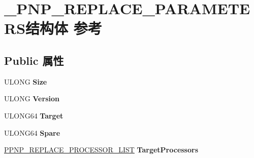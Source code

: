 \hypertarget{struct___p_n_p___r_e_p_l_a_c_e___p_a_r_a_m_e_t_e_r_s}{}\section{\+\_\+\+P\+N\+P\+\_\+\+R\+E\+P\+L\+A\+C\+E\+\_\+\+P\+A\+R\+A\+M\+E\+T\+E\+R\+S结构体 参考}
\label{struct___p_n_p___r_e_p_l_a_c_e___p_a_r_a_m_e_t_e_r_s}
\subsection*{Public 属性}
\begin{DoxyCompactItemize}
\item 
\mbox{\label{struct___p_n_p___r_e_p_l_a_c_e___p_a_r_a_m_e_t_e_r_s_a4cfdef7f7338ef93936209b069cecb13}} 
U\+L\+O\+NG {\bfseries Size}
\item 
\mbox{\label{struct___p_n_p___r_e_p_l_a_c_e___p_a_r_a_m_e_t_e_r_s_a1e1000807f3221c711d791f685b30fd9}} 
U\+L\+O\+NG {\bfseries Version}
\item 
\mbox{\label{struct___p_n_p___r_e_p_l_a_c_e___p_a_r_a_m_e_t_e_r_s_ae1abe6e62b95ed954380f5548ba32cec}} 
U\+L\+O\+N\+G64 {\bfseries Target}
\item 
\mbox{\label{struct___p_n_p___r_e_p_l_a_c_e___p_a_r_a_m_e_t_e_r_s_a83c9871dbc49fbca88deb32ab6e3bf13}} 
U\+L\+O\+N\+G64 {\bfseries Spare}
\item 
\mbox{\label{struct___p_n_p___r_e_p_l_a_c_e___p_a_r_a_m_e_t_e_r_s_ab3974b2fbf64927e6e7ada59da2ebb29}} 
\hyperlink{struct___p_n_p___r_e_p_l_a_c_e___p_r_o_c_e_s_s_o_r___l_i_s_t}{P\+P\+N\+P\+\_\+\+R\+E\+P\+L\+A\+C\+E\+\_\+\+P\+R\+O\+C\+E\+S\+S\+O\+R\+\_\+\+L\+I\+ST} {\bfseries Target\+Processors}
\item 
\mbox{\label{struct___p_n_p___r_e_p_l_a_c_e___p_a_r_a_m_e_t_e_r_s_a2a21a99669dbae0673c1576937e77ec1}} 

\end{DoxyCompactItemize}
